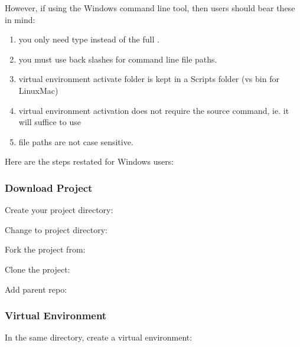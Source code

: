 \documentclass[letterpaper,10pt,english]{sphinxmanual}
\begin{document}
However, if using the Windows command line tool, then users should bear these in mind:
\begin{enumerate}
\def\theenumi{\arabic{enumi}}
\def\labelenumi{\theenumi .}
\makeatletter\def\p@enumii{\p@enumi \theenumi .}\makeatother
\item {} 
you only need type  instead of the full .

\item {} 
you must use back slashes for command line file paths.

\item {} 
virtual environment activate folder is kept in a Scripts folder (vs bin for LinuxMac)

\item {} 
virtual environment activation does not require the source command, ie. it will suffice to use 

\item {} 
file paths are not case sensitive.

\end{enumerate}

Here are the steps restated for Windows users:


\subsubsection{Download Project}
\label{\detokenize{guide/01_quickstart:id1}}
Create your project directory: 

Change to project directory: 

Fork the project from: 

Clone the project: 

Add parent repo: 


\subsubsection{Virtual Environment}
\label{\detokenize{guide/01_quickstart:id2}}
In the same directory, create a virtual environment: 
\end{document}
